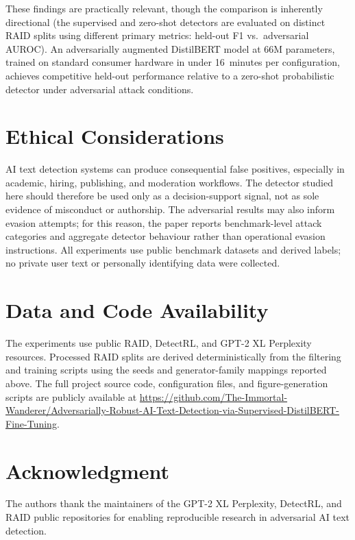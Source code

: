 \documentclass[conference]{IEEEtran}
\begin{document}
These findings are practically relevant, though the comparison is inherently
directional (the supervised and zero-shot detectors are evaluated on distinct
RAID splits using different primary metrics: held-out F1 vs.\ adversarial
AUROC). An adversarially augmented
DistilBERT model at 66M parameters, trained on standard consumer hardware in
under 16~minutes per configuration, achieves competitive held-out performance
relative to a zero-shot probabilistic detector under adversarial attack conditions.

\section*{Ethical Considerations}

AI text detection systems can produce consequential false positives, especially
in academic, hiring, publishing, and moderation workflows. The detector studied
here should therefore be used only as a decision-support signal, not as sole
evidence of misconduct or authorship. The adversarial results may also inform
evasion attempts; for this reason, the paper reports benchmark-level attack
categories and aggregate detector behaviour rather than operational evasion
instructions. All experiments use public benchmark datasets and derived labels;
no private user text or personally identifying data were collected.

\section*{Data and Code Availability}

The experiments use public RAID, DetectRL, and GPT-2 XL Perplexity resources.
Processed RAID splits are derived deterministically from the filtering and
training scripts using the seeds and generator-family mappings reported above.
The full project source code, configuration files, and figure-generation
scripts are publicly available at
\url{https://github.com/The-Immortal-Wanderer/Adversarially-Robust-AI-Text-Detection-via-Supervised-DistilBERT-Fine-Tuning}.

\section*{Acknowledgment}

The authors thank the maintainers of the GPT-2 XL Perplexity, DetectRL, and RAID
public repositories for enabling reproducible research in adversarial AI
text detection.
\end{document}
